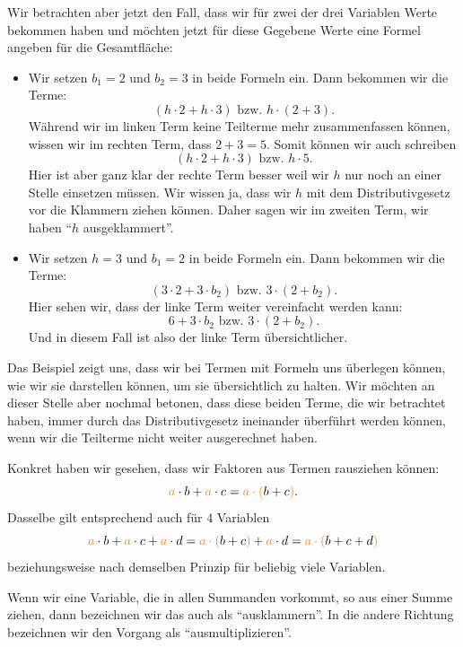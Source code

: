 \documentclass[../../main.tex]{subfiles}
\begin{document}
\begin{example}{}
		Wir betrachten aber jetzt den Fall, dass wir für zwei der drei Variablen Werte bekommen haben und möchten
		jetzt für diese Gegebene Werte eine Formel angeben für die Gesamtfläche:
		\begin{itemize}
			\item Wir setzen $b_1=2$ und $b_2=3$ in beide Formeln ein. Dann bekommen wir die Terme:
				\[(h\cdot 2 + h\cdot 3) \text{ bzw. } h\cdot(2+3).\]
				Während wir im linken Term keine Teilterme mehr zusammenfassen können, wissen wir im rechten Term, dass $2+3=5$.
				Somit können wir auch schreiben
				\[(h\cdot 2 + h\cdot 3) \text{ bzw. } h\cdot 5.\]
				Hier ist aber ganz klar der rechte Term besser weil wir $h$ nur noch an einer Stelle einsetzen müssen.
				Wir wissen ja, dass wir $h$ mit dem Distributivgesetz vor die Klammern ziehen können. Daher sagen wir
				im zweiten Term, wir haben \enquote{$h$ ausgeklammert}.
			\item Wir setzen $h=3$ und $b_1=2$ in beide Formeln ein. Dann bekommen wir die Terme:
				\[(3\cdot2+3\cdot b_2) \text{ bzw. } 3\cdot(2+b_2).\]
				Hier sehen wir, dass der linke Term weiter vereinfacht werden kann:
				\[6+3\cdot b_2 \text{ bzw. } 3\cdot(2+b_2).\]
				Und in diesem Fall ist also der linke Term übersichtlicher.
		\end{itemize}
	\end{example}

	Das Beispiel zeigt uns, dass wir bei Termen mit Formeln uns überlegen können, wie wir sie darstellen können, um sie übersichtlich
	zu halten. Wir möchten an dieser Stelle aber nochmal betonen, dass diese beiden Terme, die wir betrachtet haben, immer durch das
	Distributivgesetz ineinander überführt werden können, wenn wir die Teilterme nicht weiter ausgerechnet haben.

	Konkret haben wir gesehen, dass wir Faktoren aus Termen rausziehen können:
	\[{\color{orange}a}\cdot b + {\color{orange}a}\cdot c = {\color{orange}a\cdot (}b+c{\color{orange})}.\]
	Dasselbe gilt entsprechend auch für 4 Variablen
	\[{\color{orange}a}\cdot b + {\color{orange}a}\cdot c + {\color{orange}a}\cdot d = {\color{orange}a\cdot (}b+c{\color{orange})} + {\color{orange}a}\cdot d = {\color{orange}a\cdot (}b+c+d{\color{orange})}\]
	beziehungsweise nach demselben Prinzip für beliebig viele Variablen.

	Wenn wir eine Variable, die in allen Summanden vorkommt, so aus einer Summe ziehen, dann bezeichnen wir das auch als \enquote{ausklammern}.
	In die andere Richtung bezeichnen wir den Vorgang als \enquote{ausmultiplizieren}.
\end{document}
